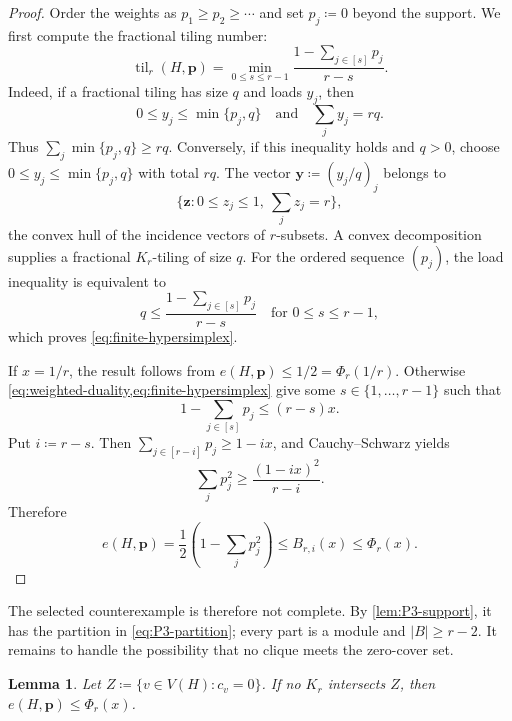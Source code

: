 \documentclass[10pt]{article}
\numberwithin{equation}{section}
\newtheorem{lemma}[lemma]{Lemma}
\newcommand{\til}{\operatorname{til}}
\newcommand{\vct}[1]{\boldsymbol{#1}}
\begin{document}
\begin{proof}
Order the weights as $p_1\ge p_2\ge\cdots$ and set $p_j\coloneqq0$ beyond the support.  We first compute the fractional tiling number:
\begin{equation}\label{eq:finite-hypersimplex}
 \til_r(H,\vct p)=
 \min_{0\le s\le r-1}\frac{1-\sum_{j\in[s]}p_j}{r-s}.
\end{equation}
Indeed, if a fractional tiling has size $q$ and loads $y_j$, then
\[
 0\le y_j\le\min\{p_j,q\}
 \quad\text{and}\quad
 \sum_jy_j=rq.
\]
Thus $\sum_j\min\{p_j,q\}\ge rq$.  Conversely, if this inequality holds and $q>0$, choose $0\le y_j\le\min\{p_j,q\}$ with total $rq$.  The vector $\vct y\coloneqq(y_j/q)_j$ belongs to
\[
 \{\vct z\colon 0\le z_j\le1,\ \sum_jz_j=r\},
\]
the convex hull of the incidence vectors of $r$-subsets.  A convex decomposition supplies a fractional $K_r$-tiling of size $q$.  For the ordered sequence $(p_j)$, the load inequality is equivalent to
\[
 q\le\frac{1-\sum_{j\in[s]}p_j}{r-s}
 \quad\text{for }0\le s\le r-1,
\]
which proves \cref{eq:finite-hypersimplex}.

If $x=1/r$, the result follows from $e(H,\vct p)\le1/2=\Phi_r(1/r)$.  Otherwise \cref{eq:weighted-duality,eq:finite-hypersimplex} give some $s\in\{1,\ldots,r-1\}$ such that
\[
 1-\sum_{j\in[s]}p_j\le(r-s)x.
\]
Put $i\coloneqq r-s$.  Then $\sum_{j\in[r-i]}p_j\ge1-ix$, and Cauchy--Schwarz yields
\[
 \sum_jp_j^2\ge\frac{(1-ix)^2}{r-i}.
\]
Therefore
\[
 e(H,\vct p)=\frac12\left(1-\sum_jp_j^2\right)
 \le B_{r,i}(x)\le \Phi_r(x).
\]
\end{proof}

The selected counterexample is therefore not complete.  By \cref{lem:P3-support}, it has the partition in \cref{eq:P3-partition}; every part is a module and $|B|\ge r-2$.  It remains to handle the possibility that no clique meets the zero-cover set.

\begin{lemma}\label{lem:weighted-terminal}
Let $Z\coloneqq\{v\in V(H)\colon c_v=0\}$.  If no $K_r$ intersects $Z$, then $e(H,\vct p)\le \Phi_r(x)$.
\end{lemma}
\end{document}

